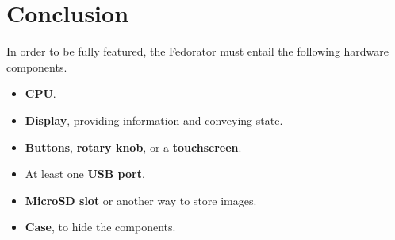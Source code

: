     \section{Conclusion}
        
        In order to be fully featured, the Fedorator must entail the following hardware components.
        \begin{itemize}
            \item \textbf{CPU}.
            \item \textbf{Display}, providing information and conveying state.
            \item \textbf{Buttons}, \textbf{rotary knob}, or a \textbf{touchscreen}.
            \item At least one \textbf{USB port}.
            \item \textbf{MicroSD slot} or another way to store images.
            \item \textbf{Case}, to hide the components.
        \end{itemize}

